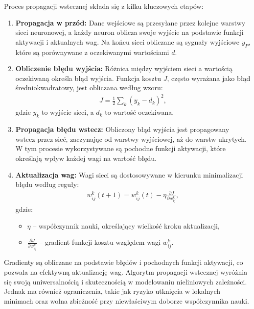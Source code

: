 \documentclass[a4paper,twoside,12pt]{book}
\begin{document}
Proces propagacji wstecznej składa się z kilku kluczowych etapów:
\begin{enumerate}
    \item \textbf{Propagacja w przód:} Dane wejściowe są przesyłane przez kolejne warstwy sieci neuronowej, a każdy neuron oblicza swoje wyjście na podstawie funkcji aktywacji i aktualnych wag. Na końcu sieci obliczane są sygnały wyjściowe \( y_P \), które są porównywane z oczekiwanymi wartościami \( d \).
    
    \item \textbf{Obliczenie błędu wyjścia:} Różnica między wyjściem sieci a wartością oczekiwaną określa błąd wyjścia. Funkcja kosztu \( J \), często wyrażana jako błąd średniokwadratowy, jest obliczana według wzoru:
    \begin{align}
        J = \frac{1}{2} \sum_{k} (y_k - d_k)^2,
    \end{align}
    gdzie \( y_k \) to wyjście sieci, a \( d_k \) to wartość oczekiwana.

    \item \textbf{Propagacja błędu wstecz:} Obliczony błąd wyjścia jest propagowany wstecz przez sieć, zaczynając od warstwy wyjściowej, aż do warstw ukrytych. W tym procesie wykorzystywane są pochodne funkcji aktywacji, które określają wpływ każdej wagi na wartość błędu.

    \item \textbf{Aktualizacja wag:} Wagi sieci są dostosowywane w kierunku minimalizacji błędu według reguły:
    \begin{align}
        w_{ij}^k(t+1) = w_{ij}^k(t) - \eta \frac{\partial J}{\partial w_{ij}^k},
    \end{align}
    gdzie:
    \begin{itemize}
        \item \( \eta \) – współczynnik nauki, określający wielkość kroku aktualizacji,
        \item \( \frac{\partial J}{\partial w_{ij}^k} \) – gradient funkcji kosztu względem wagi \( w_{ij}^k \).
    \end{itemize}
\end{enumerate}

Gradienty są obliczane na podstawie błędów i pochodnych funkcji aktywacji, co pozwala na efektywną aktualizację wag. 
Algorytm propagacji wstecznej wyróżnia się swoją uniwersalnością i skutecznością w modelowaniu nieliniowych zależności. Jednak ma również ograniczenia, takie jak ryzyko utknięcia w lokalnych minimach oraz wolna zbieżność przy niewłaściwym doborze współczynnika nauki.
\end{document}
